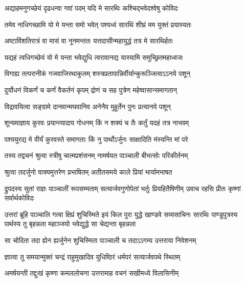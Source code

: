 \twolineshloka
{अद्याहमनुगच्छेयं दृढधन्वा गवां पदम्}
{यदि मे सारथिः कश्चिद्भवेदश्वेषु कोविदः}


\twolineshloka
{तमेव नाधिगच्छामि यो मे यन्ता समो भवेत्}
{पश्यध्वं सारथिं शीघ्रं मम युक्तं प्रयास्यतः}


\twolineshloka
{अष्टाविंशतिरात्रं वा मासं वा नूनमन्ततः}
{यत्तदासीन्महायुद्धं तत्र मे सारथिर्हतः}


\twolineshloka
{यद्यहं त्वधिगच्छेयं यो मे यन्ता भवेद्युधि}
{त्वरावानद्य यास्यामि समुच्छ्रितमहाध्वजः}


\twolineshloka
{विगाह्य तत्परानीकं गजवाजिरथाकुलम्}
{शस्त्रप्रतापान्निर्वीर्यान्कुरूञ्जित्वाऽऽनये पशून्}


\twolineshloka
{दुर्योधनं विकर्णं च कर्णं वैकर्तनं कृपम्}
{द्रोणं च सह पुत्रेण महेष्वासान्समागतान्}


\twolineshloka
{विद्रावयित्वा सङ्ग्रामे दानवान्मघवानिव}
{अनेनैव मुहूर्तेन पुनः प्रत्यानये पशून्}


\twolineshloka
{शून्यमाज्ञाय कुरवः प्रयान्त्यादाय गोधनम्}
{किं न शक्यं च तैः कर्तुं यदहं तत्र नाभवम्}


\twolineshloka
{पश्ययुरद्य मे वीर्यं कुरवस्ते समागताः}
{किं नु पार्थोऽर्जुनः साक्षादिति मंस्यन्ति मां परे}




\twolineshloka
{तस्य तद्वचनं श्रुत्वा स्त्रीषु चात्मप्रशंसनम्}
{नामर्षयत पाञ्चाली बीभत्सोः परिकीर्तनम्}


\twolineshloka
{श्रुत्वा तदर्जुनो वाक्यमुत्तरेण प्रभाषितम्}
{अतीतसमये काले प्रियां भार्यामभाषत}


\threelineshloka
{द्रुपदस्य सुतां राज्ञः पाञ्चालीं रूपसम्मताम्}
{सत्यार्जवगुणोपेतां भर्तुः प्रियहितैषिणीम्}
{उवाच रहसि प्रीतः कृष्णां सर्वार्थकोविदः}


\onelineshloka
{उत्तरां ब्रूहि पाञ्चालि गत्वा क्षिप्रं शुचिस्मिते}
\threelineshloka
{इयं किल पुरा युद्धे खाण्डवे सव्यसाचिनः}
{सारथिः पाण्डुपुत्रस्य पार्थस्य तु बृहन्नला}
{महाञ्जयो भवेद्युद्धे सा चेद्यन्ता बृहन्नला}



\twolineshloka
{सा चोदिता तदा ह्येन ह्यर्जुनेन शुचिस्मिता}
{पाञ्चाली च तदाऽऽगम्य उत्तराया निवेशनम्}


\twolineshloka
{ज्ञात्वा तु समयान्मुक्तं चन्द्रं राहुमुखादिव}
{युधिष्ठिरं धर्मपरं सत्यार्जवपथे स्थितम्}


\twolineshloka
{अमर्षयन्ती तद्दुःखं कृष्णा कमललोचना}
{उत्तरामाह वचनं सखीमध्ये विलासिनीम्}


